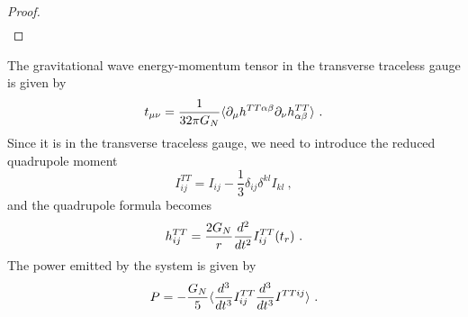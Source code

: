 \begin{proof}
\begin{equation*}
\begin{aligned}
        \end{aligned}
        \end{equation*}
    \end{proof}

    \hfill 

    The gravitational wave energy-momentum tensor in the transverse traceless gauge is given by 
    \begin{equation*}
        t_{\mu\nu} = \frac{1}{32 \pi G_N} \langle\partial_\mu h^{TT \alpha \beta} \partial_\nu h^{TT}_{\alpha \beta}\rangle ~.
    \end{equation*}
    Since it is in the transverse traceless gauge, we need to introduce the reduced quadrupole moment 
    \begin{equation*}
        I^{TT}_{ij} = I_{ij} - \frac{1}{3} \delta_{ij} \delta^{kl} I_{kl} ~,
    \end{equation*}
    and the quadrupole formula becomes 
    \begin{equation*}
        h_{ij}^{TT} = \frac{2G_N}{r} \frac{d^2}{dt^2} I^{TT}_{ij} (t_r) ~.
    \end{equation*}
    The power emitted by the system is given by 
    \begin{equation*}
        P = - \frac{G_N}{5} \langle\frac{d^3}{dt^3} I^{TT}_{ij} \frac{d^3}{dt^3} I^{TT ij}\rangle ~.
    \end{equation*}

